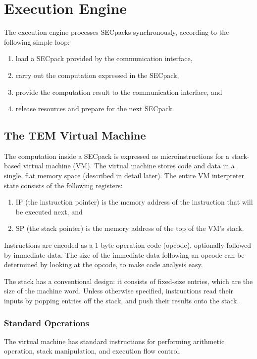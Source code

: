 \section{Execution Engine}\label{arch:execution}
The execution engine processes SECpacks synchronously, according to
the following simple loop:
\begin{enumerate}
  \item load a SECpack provided by the communication interface,
  \item carry out the computation expressed in the SECpack,
  \item provide the computation result to the communication interface, and
  \item release resources and prepare for the next SECpack.
\end{enumerate}

\subsection{The TEM Virtual Machine}\label{arch:vm}
The computation inside a SECpack is expressed as microinstructions
for a stack-based virtual machine (VM). The virtual machine stores code and data
in a single, flat memory space (described in detail later). The entire VM
interpreter state consists of the following registers:
\begin{enumerate}
  \item {IP (the instruction pointer)} is the memory address of the instruction
  that will be executed next, and
  \item {SP (the stack pointer)} is the memory
  address of the top of the VM's stack.
\end{enumerate}

Instructions are encoded as a 1-byte operation code (opcode), optionally
followed by immediate data. The size of the immediate data following an opcode
can be determined by looking at the opcode, to make code analysis easy.

The stack has a conventional design: it consists of fixed-size entries, which
are the size of the machine word. Unless otherwise specified, instructions read
their inputs by popping entries off the stack, and push their results onto the
stack.

\subsubsection{Standard Operations}
The virtual machine has standard instructions for performing arithmetic
operation, stack manipulation, and execution flow control.

